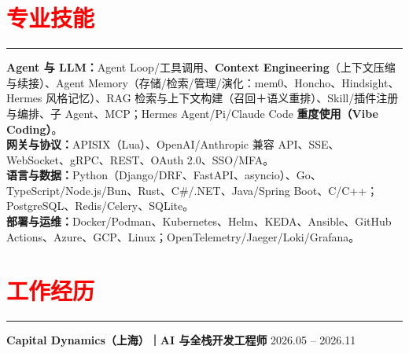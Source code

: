 \documentclass[10pt,a4paper]{article}
\begin{document}
\section*{\textcolor{red}{专业技能}}
\vspace*{-4ex}
\noindent\textcolor{red}{\rule{\linewidth}{0.4pt}}
\textbf{Agent 与 LLM：}Agent Loop/工具调用、\textbf{Context Engineering}（上下文压缩与续接）、Agent Memory（存储/检索/管理/演化：mem0、Honcho、Hindsight、Hermes 风格记忆）、RAG 检索与上下文构建（召回＋语义重排）、Skill/插件注册与编排、子 Agent、MCP；Hermes Agent/Pi/Claude Code \textbf{重度使用（Vibe Coding）}。\\
\textbf{网关与协议：}APISIX（Lua）、OpenAI/Anthropic 兼容 API、SSE、WebSocket、gRPC、REST、OAuth 2.0、SSO/MFA。\\
\textbf{语言与数据：}Python（Django/DRF、FastAPI、asyncio）、Go、TypeScript/Node.js/Bun、Rust、C\#/.NET、Java/Spring Boot、C/C++；PostgreSQL、Redis/Celery、SQLite。\\
\textbf{部署与运维：}Docker/Podman、Kubernetes、Helm、KEDA、Ansible、GitHub Actions、Azure、GCP、Linux；OpenTelemetry/Jaeger/Loki/Grafana。

\section*{\textcolor{red}{工作经历}}
\vspace*{-4ex}
\noindent\textcolor{red}{\rule{\linewidth}{0.4pt}}
\textbf{Capital Dynamics（上海）｜AI 与全栈开发工程师} \hfill 2026.05 -- 2026.11
\end{document}
